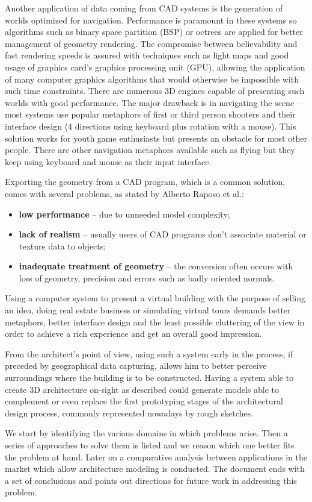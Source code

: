 Another application of data coming from CAD systems is the generation of worlds optimized for navigation.
Performance is paramount in these systems so algorithms such as binary space partition (BSP) or octrees are applied
for better management of geometry rendering. The compromise between believability and fast rendering speeds
is assured with techniques such as light maps and good usage of graphics card's graphics processing unit (GPU),
allowing the application of many computer graphics algorithms that would otherwise be impossible with such time constraints.
There are numerous 3D engines capable of presenting such worlds with good performance.
The major drawback is in navigating the scene -- most systems use popular metaphors of first or third person shooters and
their interface design (4 directions using keyboard plus rotation with a mouse). This solution works for youth
game enthusiasts but presents an obstacle for most other people.
There are other navigation metaphors available such as flying but they keep using keyboard and mouse as their input interface.

Exporting the geometry from a CAD program, which is a common solution, comes with several problems,
as stated by Alberto Raposo et al.\cite{CADVR06}:
\begin{itemize}
	\item \textbf{low performance} -- due to unneeded model complexity;
	\item \textbf{lack of realism} -- usually users of CAD programs don't associate material
	or texture data to objects;
	\item \textbf{inadequate treatment of geometry} -- the conversion often occurs with loss of
	geometry, precision and errors such as badly oriented normals.
\end{itemize}

Using a computer system to present a virtual building with the purpose of selling an idea, doing real estate business
or simulating virtual tours demands better metaphors, better interface design and the least possible cluttering
of the view in order to achieve a rich experience and get an overall good impression.

From the architect's point of view, using such a system early in the process, if preceded by geographical data capturing,
allows him to better perceive surroundings where the building is to be constructed.
Having a system able to create 3D architecture on-sight as described could generate models able to
complement or even replace the first prototyping stages of the architectural design process,
commonly represented nowadays by rough sketches.

We start by identifying the various domains in which problems arise. Then a series of approaches to solve them is
listed and we reason which one better fits the problem at hand. Later on a comparative analysis between applications
in the market which allow architecture modeling is conducted. The document ends with a set of conclusions and
points out directions for future work in addressing this problem.
